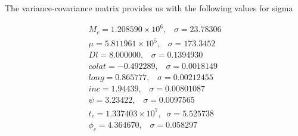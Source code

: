 \documentclass[prd,aps,amsfonts,amsmath, nofootinbib]{revtex4}
\def\en{\end{equation}}
\def\bea{\begin{eqnarray}}
\def\ena{\end{eqnarray}}
\begin{document}
The variance-covariance matrix provides us with the following values for sigma

\bea
M_c = 1.208590\times 10^6,\;\;\;     \sigma = 23.78306\\
\mu = 5.811961\times 10^5,\;\;\;     \sigma = 173.3452\\
Dl = 8.000000,\;\;\;     \sigma = 0.1394930\\
colat = -0.492289, \;\;\;   \sigma = 0.0018149\\
long = 0.865777 , \;\;\;      \sigma = 0.00212455\\
inc = 1.94439 , \;\;\;       \sigma = 0.00801087\\
\psi = 3.23422, \;\;\;        \sigma = 0.0097565\\
t_c = 1.337403\times 10^7,\;\;    \sigma = 5.525738\\
\phi_c = 4.364670, \;\;\;      \sigma = 0.058297
\ena
\end{document}
